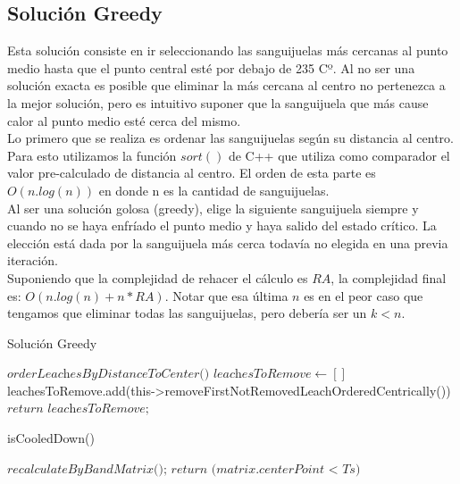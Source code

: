 \subsection{Solución Greedy}
Esta solución consiste en ir seleccionando las sanguijuelas más cercanas al punto medio hasta que el punto central esté por debajo de 235 Cº. Al no ser una solución exacta es posible que eliminar la más cercana al centro no pertenezca a la mejor solución, pero es intuitivo suponer que la sanguijuela que más cause calor al punto medio esté cerca del mismo. \\
Lo primero que se realiza es ordenar las sanguijuelas según su distancia al centro. Para esto utilizamos la función $sort()$ de C++ que utiliza como comparador el valor pre-calculado de distancia al centro. El orden de esta parte es $O(n.log(n))$ en donde n es la cantidad de sanguijuelas.\\
Al ser una solución golosa (greedy), elige la siguiente sanguijuela siempre y cuando no se haya enfríado el punto medio y haya salido del estado crítico. La elección está dada por la sanguijuela más cerca todavía no elegida en una previa iteración.\\
Suponiendo que la complejidad de rehacer el cálculo es $RA$, la complejidad final es:  $O(n.log(n) + n*RA)$. Notar que esa última $n$ es en el peor caso que tengamos que eliminar todas las sanguijuelas, pero debería ser un $k < n$.

\newpage

\begin{algorithm}
\caption{Solución Greedy}\label{euclid}
\begin{algorithmic}[1]
\State $\textit{orderLeachesByDistanceToCenter()}$
\State $\textit{leachesToRemove} \gets []$
\Do
    \State leachesToRemove.add(this->removeFirstNotRemovedLeachOrderedCentrically())
\State $\textit{return leachesToRemove;}$
\end{algorithmic}
\end{algorithm}

\begin{algorithm}
\caption{isCooledDown()}\label{euclid}
\begin{algorithmic}[1]
\State $\textit{recalculateByBandMatrix();}$
\State $\textit{return (matrix.centerPoint < Ts)}$ 
\end{algorithmic}
\end{algorithm}

